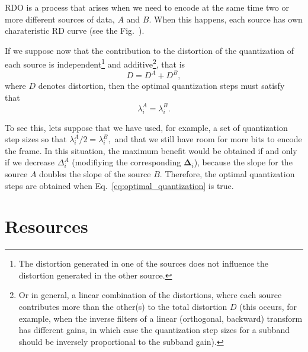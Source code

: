RDO is a process that arises when we need to encode at the same time
two or more different sources of data, $A$ and $B$. When this happens,
each source has own charateristic RD curve (see the
Fig.~\cite{RD_slopes}).

If we suppose now that the contribution to the distortion of the
quantization of each source is independent\footnote{The distortion
generated in one of the sources does not influence the distortion
generated in the other source.} and additive\footnote{Or in general, a
linear combination of the distortions, where each source contributes
more than the other(s) to the total distortion $D$ (this occurs, for
example, when the inverse filters of a linear (orthogonal, backward)
transform has different gains, in which case the quantization step
sizes for a subband should be inversely proportional to the subband
gain).}, that is
\begin{equation}
  D = D^A + D^B,
  \label{eq:additive}
\end{equation}
where $D$ denotes distortion, then the optimal quantization steps must
satisfy that~\cite{vetterli1995wavelets,sayood2017introduction}
\begin{equation}
  \lambda^A_i = \lambda^B_i.
  \label{eq:optimal_quantization}
\end{equation}

To see this, lets suppose that we have used, for example, a set of
quantization step sizes so that $\lambda^A_i/2 = \lambda^B_i,$ and
that we still have room for more bits to encode the frame. In this
situation, the maximum benefit would be obtained if and only if we
decrease $\Delta^A_i$ (modifiying the corresponding
$\mathbf{\Delta}_i$), because the slope for the source $A$ doubles
the slope of the source $B$. Therefore, the optimal quantization
steps are obtained when Eq.~\ref{eq:optimal_quantization} is
true.

\section{Resources}
\renewcommand{\addcontentsline}[3]{}%

